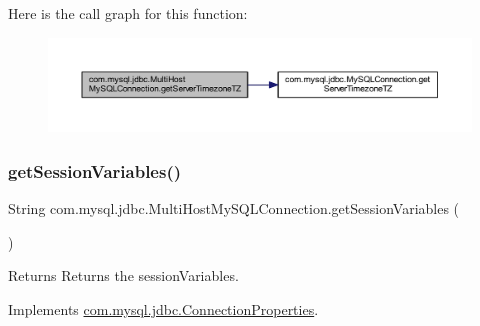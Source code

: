 Here is the call graph for this function\+:
\nopagebreak
\begin{figure}[H]
\begin{center}
\leavevmode
\includegraphics[width=350pt]{classcom_1_1mysql_1_1jdbc_1_1_multi_host_my_s_q_l_connection_a6cd4e5250d8940bbbfeb6d5a4a4efb45_cgraph}
\end{center}
\end{figure}
\mbox{\label{classcom_1_1mysql_1_1jdbc_1_1_multi_host_my_s_q_l_connection_a45d2ffee7d7d90c114e6b15180c7ebaf}} 
\subsubsection{\texorpdfstring{get\+Session\+Variables()}{getSessionVariables()}}
{\footnotesize\ttfamily String com.\+mysql.\+jdbc.\+Multi\+Host\+My\+S\+Q\+L\+Connection.\+get\+Session\+Variables (\begin{DoxyParamCaption}{ }\end{DoxyParamCaption})}

\begin{DoxyReturn}{Returns}
Returns the session\+Variables. 
\end{DoxyReturn}


Implements \mbox{\hyperlink{interfacecom_1_1mysql_1_1jdbc_1_1_connection_properties_ad63fb7021671197a1bdf1d314420a224}{com.\+mysql.\+jdbc.\+Connection\+Properties}}.

